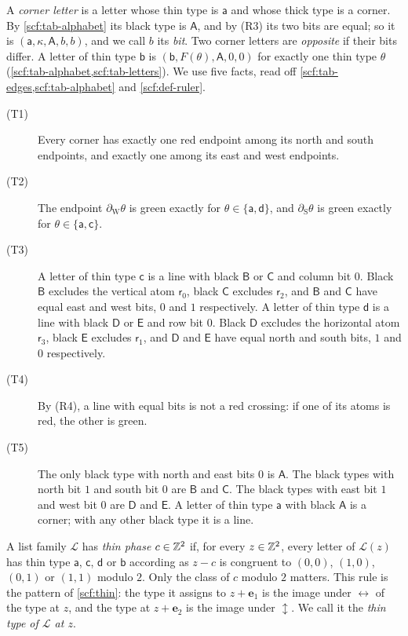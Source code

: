 A \emph{corner letter} is a letter whose thin type is $\mathsf a$ and whose thick type is a corner. By \cref{scf:tab-alphabet} its black type is $\mathsf A$, and by (R3) its two bits are equal; so it is $(\mathsf a,\kappa,\mathsf A,b,b)$, and we call $b$ its \emph{bit}. Two corner letters are \emph{opposite} if their bits differ. A letter of thin type $\mathsf b$ is $(\mathsf b,F(\theta),\mathsf A,0,0)$ for exactly one thin type $\theta$ (\cref{scf:tab-alphabet,scf:tab-letters}). We use five facts, read off \cref{scf:tab-edges,scf:tab-alphabet} and \cref{scf:def-ruler}.
\begin{description}
\item[(T1)] Every corner has exactly one red endpoint among its north and south endpoints, and exactly one among its east and west endpoints.
\item[(T2)] The endpoint $\partial_{\mathrm W}\theta$ is green exactly for $\theta\in\{\mathsf a,\mathsf d\}$, and $\partial_{\mathrm S}\theta$ is green exactly for $\theta\in\{\mathsf a,\mathsf c\}$.
\item[(T3)] A letter of thin type $\mathsf c$ is a line with black $\mathsf B$ or $\mathsf C$ and column bit $0$. Black $\mathsf B$ excludes the vertical atom $\mathsf r_0$, black $\mathsf C$ excludes $\mathsf r_2$, and $\mathsf B$ and $\mathsf C$ have equal east and west bits, $0$ and $1$ respectively. A letter of thin type $\mathsf d$ is a line with black $\mathsf D$ or $\mathsf E$ and row bit $0$. Black $\mathsf D$ excludes the horizontal atom $\mathsf r_3$, black $\mathsf E$ excludes $\mathsf r_1$, and $\mathsf D$ and $\mathsf E$ have equal north and south bits, $1$ and $0$ respectively.
\item[(T4)] By (R4), a line with equal bits is not a red crossing: if one of its atoms is red, the other is green.
\item[(T5)] The only black type with north and east bits $0$ is $\mathsf A$. The black types with north bit $1$ and south bit $0$ are $\mathsf B$ and $\mathsf C$. The black types with east bit $1$ and west bit $0$ are $\mathsf D$ and $\mathsf E$. A letter of thin type $\mathsf a$ with black $\mathsf A$ is a corner; with any other black type it is a line.
\end{description}

A list family $\mathcal L$ has \emph{thin phase} $c\in\mathbb{Z}^2$ if, for every $z\in\mathbb{Z}^2$, every letter of $\mathcal L(z)$ has thin type $\mathsf a$, $\mathsf c$, $\mathsf d$ or $\mathsf b$ according as $z-c$ is congruent to $(0,0)$, $(1,0)$, $(0,1)$ or $(1,1)$ modulo $2$. Only the class of $c$ modulo $2$ matters. This rule is the pattern of \cref{scf:thin}: the type it assigns to $z+\mathbf e_1$ is the image under ${\leftrightarrow}$ of the type at $z$, and the type at $z+\mathbf e_2$ is the image under ${\updownarrow}$. We call it the \emph{thin type of $\mathcal L$ at $z$}.


